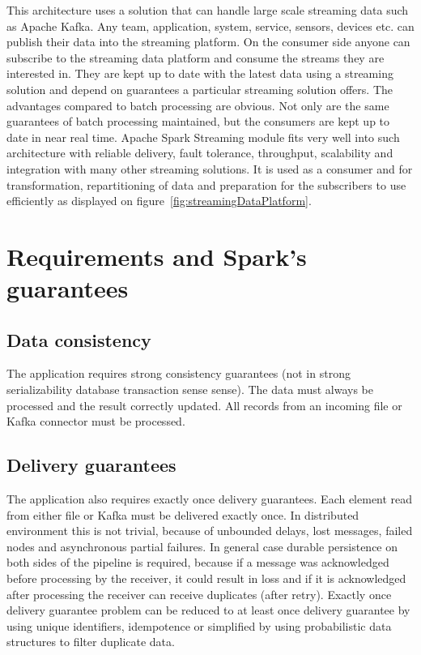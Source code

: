 \documentclass[a4paper, 10 pt, conference]{IEEEtran}
\begin{document}
This architecture uses a solution that can handle large scale streaming data such as Apache Kafka. Any team, application, system, service, sensors, devices etc. can publish their data into the streaming platform. On the consumer side anyone can subscribe to the streaming data platform and consume the streams they are interested in. They are kept up to date with the latest data using a streaming solution and depend on guarantees a particular streaming solution offers.
The advantages compared to batch processing are obvious. Not only are the same guarantees of batch processing maintained, but the consumers are kept up to date in near real time.
Apache Spark Streaming module fits very well into such architecture with reliable delivery, fault tolerance, throughput, scalability and integration with many other streaming solutions. It is used as a consumer and for transformation, repartitioning of data and preparation for the subscribers to use efficiently as displayed on figure~\ref{fig:streamingDataPlatform}.

\section{Requirements and Spark's guarantees}

\subsection{Data consistency}
The application requires strong consistency guarantees (not in strong serializability database transaction sense sense). The data must always be processed and the result correctly updated. All records from an incoming file or Kafka connector must be processed. 

\subsection{Delivery guarantees}
The application also requires exactly once delivery guarantees. Each element read from either file or Kafka must be delivered exactly once. In distributed environment this is not trivial, because of unbounded delays, lost messages, failed nodes and asynchronous partial failures. In general case durable persistence on both sides of the pipeline is required, because if a message was acknowledged before processing by the receiver, it could result in loss and if it is acknowledged after processing the receiver can receive duplicates (after retry). Exactly once delivery guarantee problem can be reduced to at least once delivery guarantee by using unique identifiers, idempotence or simplified by using probabilistic data structures to filter duplicate data.
\end{document}
